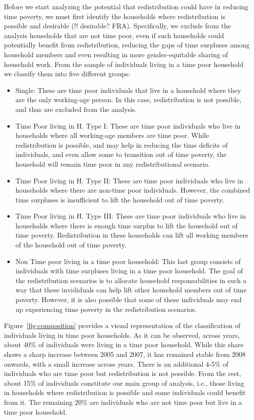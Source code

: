 \documentclass[
  11pt,
]{article}
\providecommand{\tightlist}{%
  \setlength{\itemsep}{0pt}\setlength{\parskip}{0pt}}\usepackage{longtable,booktabs,array}
\begin{document}
Before we start analyzing the potential that redistribution could have
in reducing time poverty, we must first identify the households where
redistribution is possible and desirable (!! desirable? FRA).
Specifically, we exclude from the analysis households that are not time
poor, even if such households could potentially benefit from
redistribution, reducing the gaps of time surpluses among household
members and even resulting in more gender-equitable sharing of household
work. From the sample of individuals living in a time poor household we
classify them into five different groups:

\begin{itemize}
\tightlist
\item
  Single: These are time poor individuals that live in a household where
  they are the only working-age person. In this case, redistribution is
  not possible, and thus are excluded from the analysis.
\item
  Time Poor living in H. Type I: These are time poor individuals who
  live in households where all working-age members are time poor. While
  redistribution is possible, and may help in reducing the time deficits
  of individuals, and even allow some to transition out of time poverty,
  the household will remain time poor in any redistributional scenario.
\item
  Time Poor living in H. Type II: These are time poor individuals who
  live in households where there are non-time poor individuals. However,
  the combined time surpluses is insufficient to lift the household out
  of time poverty.
\item
  Time Poor living in H. Type III: These are time poor individuals who
  live in households where there is enough time surplus to lift the
  household out of time poverty. Redistribution in these households can
  lift all working members of the household out of time poverty.
\item
  Non Time poor living in a time poor household: This last group
  consists of individuals with time surpluses living in a time poor
  household. The goal of the redistribution scenarios is to allocate
  household responsabilities in such a way that these invididuals can
  help lift other household members out of time poverty. However, it is
  also possible that some of these individuals may end up experiencing
  time poverty in the redistribution scenarios.
\end{itemize}

Figure~\ref{fig-composition} provides a visual representation of the
classification of individuals living in time poor households. As it can
be observed, across years, about 40\% of individuals were living in a
time poor household. While this share shows a sharp increase between
2005 and 2007, it has remained stable from 2008 onwards, with a small
increase across years. There is an additional 4-5\% of individuals who
are time poor but redistribution is not possible. From the rest, about
15\% of individuals constitute our main group of analysis, i.e., those
living in households where redistribution is possible and some
individuals could benefit from it. The remaining 20\% are individuals
who are not time poor but live in a time poor household.
\end{document}

